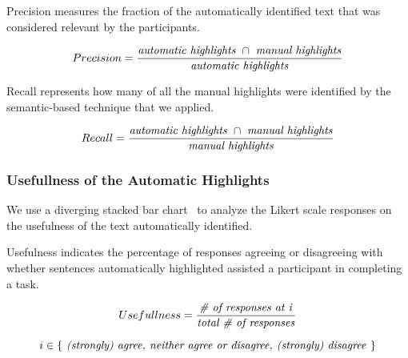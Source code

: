 Precision measures the fraction of the automatically identified text that was  considered relevant
by the participants.

\smallskip
\begin{small}


\begin{equation}
    Precision = \frac{
        \text{\textit{automatic highlights}~} \cap 
        \text{~\textit{manual highlights}}
    }{\text{\textit{automatic highlights}}}
\end{equation}
\end{small}


Recall represents how many of all the manual highlights were identified by the semantic-based technique that we applied.

\smallskip
\begin{small}

\begin{equation}
    Recall = \frac{
        \text{\textit{automatic highlights}~} \cap 
        \text{~\textit{manual highlights}}
    }{\text{\textit{manual highlights}}}
\end{equation}
\end{small}

\medskip
{}





\subsubsection{Usefullness of the Automatic Highlights}


We use a diverging stacked bar chart~\cite{Heiberger2014} to analyze the  Likert scale
responses on the usefulness of the text automatically identified.


Usefulness indicates the percentage of responses agreeing or disagreeing with whether sentences
automatically highlighted assisted a participant in completing a task.


\smallskip
\begin{small}

\begin{equation}
Usefullness = \frac{
    \text{\textit{\# of responses at i}}
}{
    \text{\textit{total \# of responses}}
}
\end{equation}
        

\begin{equation*}
i \in \{ 
    \text{\textit{
        (strongly) agree, neither agree or disagree, (strongly) disagree
    }}  
\}
\end{equation*}
\end{small}


